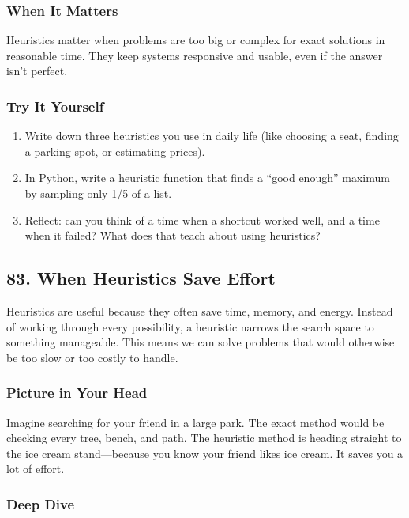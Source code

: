 \documentclass[
  letterpaper,
  DIV=11,
  numbers=noendperiod]{scrreprt}
\providecommand{\tightlist}{%
  \setlength{\itemsep}{0pt}\setlength{\parskip}{0pt}}
\begin{document}
\subsubsection{When It Matters}\label{when-it-matters-80}

Heuristics matter when problems are too big or complex for exact
solutions in reasonable time. They keep systems responsive and usable,
even if the answer isn't perfect.

\subsubsection{Try It Yourself}\label{try-it-yourself-82}

\begin{enumerate}
\def\labelenumi{\arabic{enumi}.}
\tightlist
\item
  Write down three heuristics you use in daily life (like choosing a
  seat, finding a parking spot, or estimating prices).
\item
  In Python, write a heuristic function that finds a ``good enough''
  maximum by sampling only 1/5 of a list.
\item
  Reflect: can you think of a time when a shortcut worked well, and a
  time when it failed? What does that teach about using heuristics?
\end{enumerate}

\subsection{83. When Heuristics Save
Effort}\label{when-heuristics-save-effort}

Heuristics are useful because they often save time, memory, and energy.
Instead of working through every possibility, a heuristic narrows the
search space to something manageable. This means we can solve problems
that would otherwise be too slow or too costly to handle.

\subsubsection{Picture in Your Head}\label{picture-in-your-head-83}

Imagine searching for your friend in a large park. The exact method
would be checking every tree, bench, and path. The heuristic method is
heading straight to the ice cream stand---because you know your friend
likes ice cream. It saves you a lot of effort.

\subsubsection{Deep Dive}\label{deep-dive-53}
\end{document}
